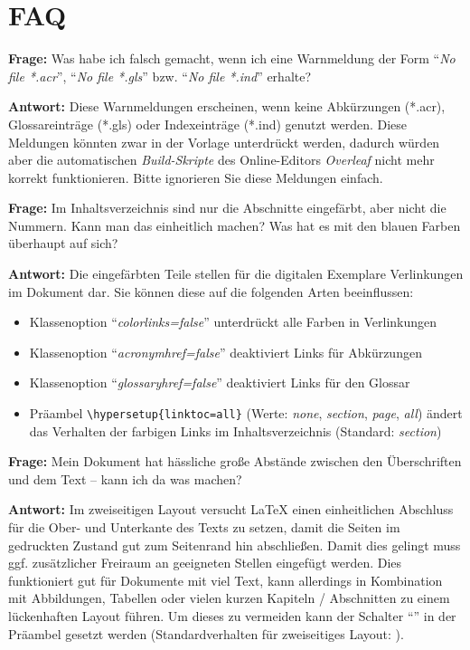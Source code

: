 \documentclass[
language=ngerman,	%
thesis=protokoll,		%
nomenclature,
%
	compactlistof,		%
%
	fancy,				%
%
%
	faculty=cb,			%
]{hsmw-vorlage-rw}
\newcommand{\faq}[2]{\textbf{Frage: }\ignorespaces#1\par\textbf{Antwort: }\ignorespaces#2\par}
\begin{document}
	\appendix
	
	
	
	\chapter{FAQ}

	\faq{
		Was habe ich falsch gemacht, wenn ich eine Warnmeldung der Form \enquote{\textit{No file *.acr}}, \enquote{\textit{No file *.gls}} bzw. \enquote{\textit{No file *.ind}} erhalte?
	}{
		Diese Warnmeldungen erscheinen, wenn keine Abkürzungen (*.acr), Glossareinträge (*.gls) oder Indexeinträge (*.ind) genutzt werden.
		Diese Meldungen könnten zwar in der Vorlage unterdrückt werden, dadurch würden aber die automatischen \textit{Build-Skripte} des Online-Editors \textit{Overleaf} nicht mehr korrekt funktionieren.
		Bitte ignorieren Sie diese Meldungen einfach.
	}
	
	\faq{
		Im Inhaltsverzeichnis sind nur die Abschnitte eingefärbt, aber nicht die Nummern.
		Kann man das einheitlich machen?
		Was hat es mit den blauen Farben überhaupt auf sich?
	}{
		Die eingefärbten Teile stellen für die digitalen Exemplare Verlinkungen im Dokument dar.
		Sie können diese auf die folgenden Arten beeinflussen: 
		\begin{itemize}
			\item Klassenoption \enquote{\textit{colorlinks=false}} unterdrückt alle Farben in Verlinkungen
			\item Klassenoption \enquote{\textit{acronymhref=false}} deaktiviert Links für Abkürzungen
			\item Klassenoption \enquote{\textit{glossaryhref=false}} deaktiviert Links für den Glossar
			\item Präambel \texttt{\textbackslash{}hypersetup\{linktoc=all\}} (Werte: \textit{none}, \textit{section}, \textit{page}, \textit{all}) ändert das Verhalten der farbigen Links im Inhaltsverzeichnis (Standard: \textit{section})
		\end{itemize}
	}
	
	\faq{
		Mein Dokument hat hässliche große Abstände zwischen den Überschriften und dem Text -- kann ich da was machen?
	}{
		Im zweiseitigen Layout versucht LaTeX einen einheitlichen Abschluss für die Ober- und Unterkante des Texts zu setzen, damit die Seiten im gedruckten Zustand gut zum Seitenrand hin abschließen.
		Damit dies gelingt muss ggf. zusätzlicher Freiraum an geeigneten Stellen eingefügt werden.
		Dies funktioniert gut für Dokumente mit viel Text, kann allerdings in Kombination mit Abbildungen, Tabellen oder vielen kurzen Kapiteln / Abschnitten zu einem lückenhaften Layout führen.
		Um dieses zu vermeiden kann der Schalter \enquote{\textit{\string\raggedbottom}} in der Präambel gesetzt werden (Standardverhalten für zweiseitiges Layout: \textit{\string\flushbottom}).
	}
\end{document}
